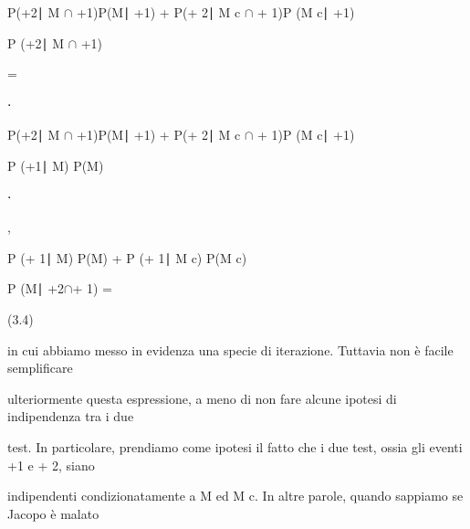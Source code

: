 \documentclass[a4paper,portrait,12pt]{article}
\begin{document}
\begin{flushleft}
P(+2∣ M $\cap$ +1)P(M∣ +1) + P(+ 2∣ M c $\cap$ + 1)P (M c∣ +1)
\end{flushleft}


\begin{flushleft}
P (+2∣ M $\cap$ +1)
\end{flushleft}


=


⋅


\begin{flushleft}
P(+2∣ M $\cap$ +1)P(M∣ +1) + P(+ 2∣ M c $\cap$ + 1)P (M c∣ +1)
\end{flushleft}


\begin{flushleft}
P (+1∣ M) P(M)
\end{flushleft}


⋅


,


\begin{flushleft}
P (+ 1∣ M) P(M) + P (+ 1∣ M c) P(M c)
\end{flushleft}





\begin{flushleft}
P (M∣ +2$\cap$+ 1) =
\end{flushleft}





(3.4)





\begin{flushleft}
in cui abbiamo messo in evidenza una specie di iterazione. Tuttavia non \`{e} facile semplificare
\end{flushleft}


\begin{flushleft}
ulteriormente questa espressione, a meno di non fare alcune ipotesi di indipendenza tra i due
\end{flushleft}


\begin{flushleft}
test. In particolare, prendiamo come ipotesi il fatto che i due test, ossia gli eventi +1 e + 2, siano
\end{flushleft}


\begin{flushleft}
indipendenti condizionatamente a M ed M c. In altre parole, quando sappiamo se Jacopo \`{e} malato
\end{flushleft}
\end{document}
